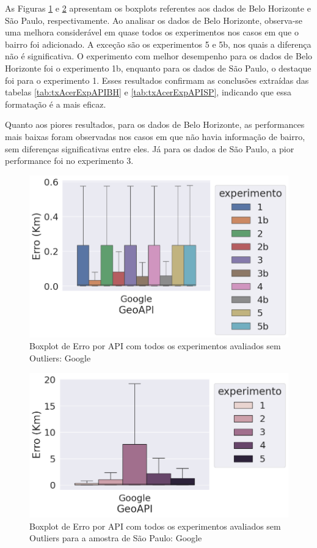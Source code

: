 As Figuras \ref{fig:boxplot-api-google-semout-bh} e \ref{fig:boxplot-api-google-semout-sp} apresentam os boxplots referentes aos dados de Belo Horizonte e São Paulo, respectivamente. Ao analisar os dados de Belo Horizonte, observa-se uma melhora considerável em quase todos os experimentos nos casos em que o bairro foi adicionado. A exceção são os experimentos 5 e 5b, nos quais a diferença não é significativa. O experimento com melhor desempenho para os dados de Belo Horizonte foi o experimento 1b, enquanto para os dados de São Paulo, o destaque foi para o experimento 1. Esses resultados confirmam as conclusões extraídas das tabelas \ref{tab:txAcerExpAPIBH} e \ref{tab:txAcerExpAPISP}, indicando que essa formatação é a mais eficaz.

Quanto aos piores resultados, para os dados de Belo Horizonte, as performances mais baixas foram observadas nos casos em que não havia informação de bairro, sem diferenças significativas entre eles. Já para os dados de São Paulo, a pior performance foi no experimento 3.


\begin{figure}[h]
    \centering
    \includegraphics[width=\textwidth]{Figuras/boxplotApiGoogleSemOut.png}
    \caption{Boxplot de Erro por API com todos os experimentos avaliados sem Outliers: Google}
    \label{fig:boxplot-api-google-semout-bh}
\end{figure}


\begin{figure}[h]
  \centering
  \includegraphics[width=\textwidth]{Figuras/boxplotApiGoogleSemOutsp.png}
  \caption{Boxplot de Erro por API com todos os experimentos avaliados sem Outliers para a amostra de São Paulo: Google}
  \label{fig:boxplot-api-google-semout-sp}
\end{figure}

